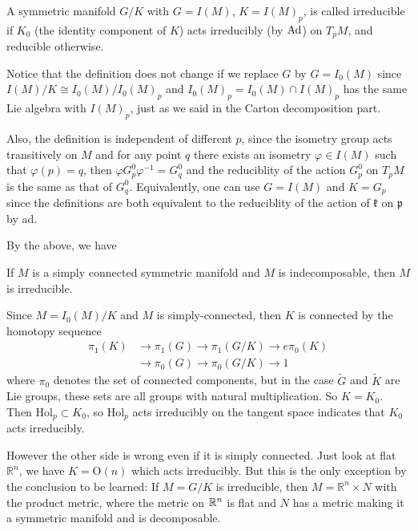 \begin{definition}
	A symmetric manifold $G / K$ with $G = {I}(M)$, $K = I(M)_p$,
	is called irreducible if $K_0$ (the identity component of
	$K$) acts irreducibly (by $\mathrm{Ad}$) on $T_pM$, and reducible
	otherwise.
\end{definition}

Notice that the definition does not change if we replace $G$ by
$G = I_0(M)$ since $I(M)/K\cong I_0(M)/I_0(M)_p$ and $I_0(M)_p =
I_0(M)\cap I(M)_p$ has the same Lie algebra with $I(M)_p$, just
as we said in the Carton decomposition part.

Also, the definition is independent of different  $p$, since the
isometry
group acts transitively on $M$ and for any point $q$ there exists
an isometry $\varphi \in I(M)$ such that $\varphi(p) = q$, then
$\varphi G_{p}^{0} \varphi^{-1} = G_{q}^{0}$ and the reduciblity
of the action $G_{p}^{0}$ on $T_{p} M$ is the same as that of
$G_{q}^{0}$. Equivalently, one can use $G = I(M)$ and $K = G_{p}
$ since the definitions are
both equivalent to the reduciblity of the action of
$\mathfrak{k}$ on $\mathfrak{p}$ by ad.


By the above, we have
\begin{theorem}
	If $M$ is a simply connected symmetric manifold and $M$ is
	indecomposable, then $M$ is irreducible.
\end{theorem}
\bproof
Since $M = I_{0}(M) / K$ and $M$ is simply-connected, then $K$ is
connected by the homotopy sequence
\[
\begin{aligned}
	\pi_{1}(K) & \rightarrow \pi_{1}(G) \rightarrow \pi_{1}(G /
	K) \rightarrow e \pi_{0}(K) \\
	& \rightarrow \pi_{0}(G) \rightarrow \pi_{0}(G / K) \rightarrow 1
\end{aligned}
\]
where $\pi_{0}$ denotes the set of connected components, but in the case $\tilde{G}$ and
$\tilde{K}$ are Lie groups, these sets are all groups with natural multiplication. So $K = K_{0} .$ Then $\mathrm{Hol}_{p} \subset K_{0}$, so $\mathrm{Hol}_{p}$ acts irreducibly on the tangent space indicates that $K_{0}$ acts irreducibly.
\eproof

However the other side is wrong even if it is simply connected.
Just look at flat $\mathbb{R}^{n}$, we have $K = \mathrm{O}(n)$
which acts irreducibly. But this is  the only exception by the
conclusion to be learned: If $M = G / K$ is irreducible, then $M
= \mathbb{R}^{n} \times N$ with the product metric, where the
metric on ${\mathbb R}^n$ is flat and $N$ has a metric making it a
symmetric manifold and is decomposable.

